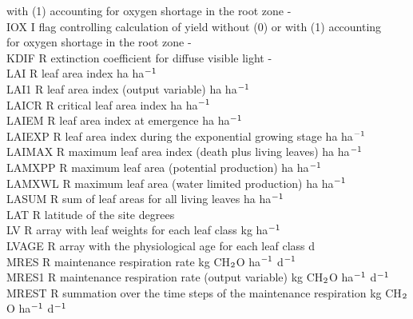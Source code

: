 \documentclass[11pt]{article}
\begin{document}
\begin{tabbing}
\>\> \> with (1) accounting for oxygen shortage in the root zone\> \> \> \> \> \> \> -\\
IOX\> \> I\> flag controlling calculation of yield without (0) or with (1) accounting\\
\>\> \> for oxygen shortage in the root zone\> \> \> \> \> \> \> -\\
KDIF\> \> R\> extinction coefficient for diffuse visible light\> \> \> \> \> \> \> -\\
LAI     \> \> R   \> leaf area index                                    \> \> \> \> \> \> \> ha ha$^{{\rm -1}}$\\
LAI1\> \> R\> leaf area index (output variable)\> \> \> \> \> \> \> ha ha$^{{\rm -1}}$\\
LAICR   \> \> R   \> critical leaf area index                           \> \> \> \> \> \> \> ha ha$^{{\rm -1}}$\\
LAIEM\> \> R\> leaf area index at emergence\> \> \> \> \> \> \> ha ha$^{{\rm -1}}$\\
LAIEXP\> \> R\> leaf area index during the exponential growing stage\> \> \> \> \> \> \> ha ha$^{{\rm -1}}$\\
LAIMAX\> \> R\> maximum leaf area index (death plus living leaves)\> \> \> \> \> \> \> ha ha$^{{\rm -1}}$\\
LAMXPP\> \> R\> maximum leaf area (potential production)\> \> \> \> \> \> \> ha ha$^{{\rm -1}}$\\
LAMXWL\> \> R\> maximum leaf area (water limited production)\> \> \> \> \> \> \> ha ha$^{{\rm -1}}$\\
LASUM   \> \> R   \> sum of leaf areas for all living leaves            \> \> \> \> \> \> \> ha ha$^{{\rm -1}}$\\
LAT\> \> R\> latitude of the site\> \> \> \> \> \> \> degrees\\
LV      \> \> R   \> array with leaf weights for each leaf class        \> \> \> \> \> \> \> kg ha$^{{\rm -1}}$\\
LVAGE   \> \> R   \> array with the physiological age for each leaf class       \> \> \> \> \> \> \> d\\
MRES    \> \> R   \> maintenance respiration rate\> \> \> \> \> \> \> kg CH$_{{\rm 2}}$O ha$^{{\rm -1}}$ d$^{{\rm -1}}$\\
MRES1\> \> R\> maintenance respiration rate (output variable)\> \> \> \> \> \> \> kg CH$_{{\rm 2}}$O ha$^{{\rm -1}}$ d$^{{\rm -1}}$\\
MREST\> \> R\> summation over the time steps of the maintenance respiration\> \> \> \> \> \> \> kg CH$_{{\rm 2}}$O ha$^{{\rm -1}}$ d$^{{\rm -1}}$\\

\end{tabbing}
\end{document}
